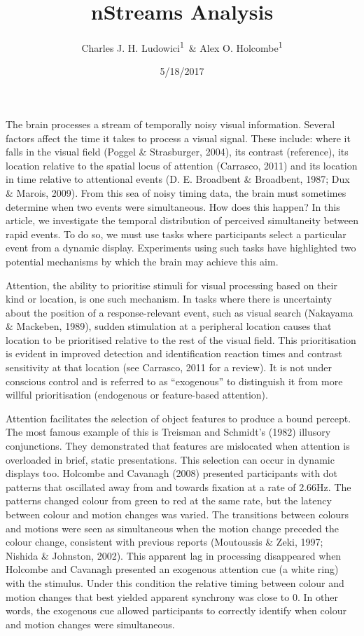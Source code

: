 \documentclass[,man,floatsintext]{apa6}
\title{nStreams Analysis}
\author{Charles J. H. Ludowici\textsuperscript{1}~\& Alex O.
Holcombe\textsuperscript{1}}
\date{5/18/2017}
\affiliation{
\vspace{0.5cm}
\textsuperscript{1} The University of Sydney}
\theoremstyle{definition}
\theoremstyle{definition}
\theoremstyle{definition}
\theoremstyle{remark}
\begin{document}
\maketitle

The brain processes a stream of temporally noisy visual information.
Several factors affect the time it takes to process a visual signal.
These include: where it falls in the visual field (Poggel \&
Strasburger, 2004), its contrast (reference), its location relative to
the spatial locus of attention (Carrasco, 2011) and its location in time
relative to attentional events (D. E. Broadbent \& Broadbent, 1987; Dux
\& Marois, 2009). From this sea of noisy timing data, the brain must
sometimes determine when two events were simultaneous. How does this
happen? In this article, we investigate the temporal distribution of
perceived simultaneity between rapid events. To do so, we must use tasks
where participants select a particular event from a dynamic display.
Experiments using such tasks have highlighted two potential mechanisms
by which the brain may achieve this aim.

Attention, the ability to prioritise stimuli for visual processing based
on their kind or location, is one such mechanism. In tasks where there
is uncertainty about the position of a response-relevant event, such as
visual search (Nakayama \& Mackeben, 1989), sudden stimulation at a
peripheral location causes that location to be prioritised relative to
the rest of the visual field. This prioritisation is evident in improved
detection and identification reaction times and contrast sensitivity at
that location (see Carrasco, 2011 for a review). It is not under
conscious control and is referred to as \enquote{exogenous} to
distinguish it from more willful prioritisation (endogenous or
feature-based attention).

Attention facilitates the selection of object features to produce a
bound percept. The most famous example of this is Treisman and Schmidt's
(1982) illusory conjunctions. They demonstrated that features are
mislocated when attention is overloaded in brief, static presentations.
This selection can occur in dynamic displays too. Holcombe and Cavanagh
(2008) presented participants with dot patterns that oscillated away
from and towards fixation at a rate of 2.66Hz. The patterns changed
colour from green to red at the same rate, but the latency between
colour and motion changes was varied. The transitions between colours
and motions were seen as simultaneous when the motion change preceded
the colour change, consistent with previous reports (Moutoussis \& Zeki,
1997; Nishida \& Johnston, 2002). This apparent lag in processing
disappeared when Holcombe and Cavanagh presented an exogenous attention
cue (a white ring) with the stimulus. Under this condition the relative
timing between colour and motion changes that best yielded apparent
synchrony was close to 0. In other words, the exogenous cue allowed
participants to correctly identify when colour and motion changes were
simultaneous.
\end{document}
